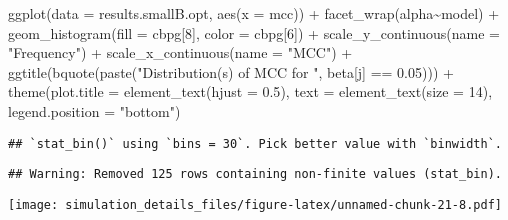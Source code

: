 \documentclass[
]{article}
\newenvironment{Shaded}{\begin{snugshade}}{\end{snugshade}}
\newcommand{\AttributeTok}[1]{\textcolor[rgb]{0.77,0.63,0.00}{#1}}
\newcommand{\DecValTok}[1]{\textcolor[rgb]{0.00,0.00,0.81}{#1}}
\newcommand{\FloatTok}[1]{\textcolor[rgb]{0.00,0.00,0.81}{#1}}
\newcommand{\FunctionTok}[1]{\textcolor[rgb]{0.00,0.00,0.00}{#1}}
\newcommand{\NormalTok}[1]{#1}
\newcommand{\SpecialCharTok}[1]{\textcolor[rgb]{0.00,0.00,0.00}{#1}}
\newcommand{\StringTok}[1]{\textcolor[rgb]{0.31,0.60,0.02}{#1}}
\begin{document}
\begin{Shaded}
\begin{Highlighting}[]
\FunctionTok{ggplot}\NormalTok{(}\AttributeTok{data =}\NormalTok{ results.smallB.opt,}
       \FunctionTok{aes}\NormalTok{(}\AttributeTok{x =}\NormalTok{ mcc)) }\SpecialCharTok{+}
  \FunctionTok{facet\_wrap}\NormalTok{(alpha}\SpecialCharTok{\textasciitilde{}}\NormalTok{model) }\SpecialCharTok{+}
  \FunctionTok{geom\_histogram}\NormalTok{(}\AttributeTok{fill =}\NormalTok{ cbpg[}\DecValTok{8}\NormalTok{], }\AttributeTok{color =}\NormalTok{ cbpg[}\DecValTok{6}\NormalTok{]) }\SpecialCharTok{+}
  \FunctionTok{scale\_y\_continuous}\NormalTok{(}\AttributeTok{name =} \StringTok{"Frequency"}\NormalTok{) }\SpecialCharTok{+}
  \FunctionTok{scale\_x\_continuous}\NormalTok{(}\AttributeTok{name =} \StringTok{"MCC"}\NormalTok{) }\SpecialCharTok{+}
  \FunctionTok{ggtitle}\NormalTok{(}\FunctionTok{bquote}\NormalTok{(}\FunctionTok{paste}\NormalTok{(}\StringTok{"Distribution(s) of MCC for "}\NormalTok{, beta[j] }\SpecialCharTok{==} \FloatTok{0.05}\NormalTok{))) }\SpecialCharTok{+}
  \FunctionTok{theme}\NormalTok{(}\AttributeTok{plot.title =} \FunctionTok{element\_text}\NormalTok{(}\AttributeTok{hjust =} \FloatTok{0.5}\NormalTok{), }
        \AttributeTok{text =} \FunctionTok{element\_text}\NormalTok{(}\AttributeTok{size =} \DecValTok{14}\NormalTok{),}
        \AttributeTok{legend.position =} \StringTok{"bottom"}\NormalTok{)}
\end{Highlighting}
\end{Shaded}

\begin{verbatim}
## `stat_bin()` using `bins = 30`. Pick better value with `binwidth`.
\end{verbatim}

\begin{verbatim}
## Warning: Removed 125 rows containing non-finite values (stat_bin).
\end{verbatim}

\texttt{[image: simulation\_details\_files/figure-latex/unnamed-chunk-21-8.pdf]}
\end{document}
